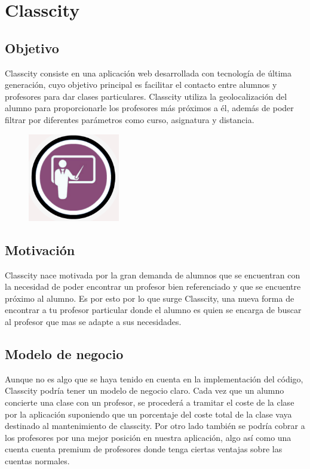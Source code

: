 \section{Classcity}
\subsection{Objetivo}

Classcity consiste en una aplicación web desarrollada con tecnología de última  generación, cuyo objetivo principal es facilitar el contacto entre alumnos y profesores para dar clases particulares. Classcity utiliza la geolocalización del alumno para proporcionarle los profesores más próximos a él, además de poder filtrar por diferentes parámetros como curso, asignatura y distancia.

\begin{figure}[H]
    \centering
    \includegraphics[width=40mm]{memoria/LaTeX/img/introduccion/logo.jpg}
\end{figure}

\subsection{Motivación}

Classcity nace motivada por la gran demanda de alumnos que se encuentran con la necesidad de poder encontrar un profesor bien referenciado y que se encuentre próximo al alumno. Es por esto por lo que surge Classcity, una nueva forma de encontrar a tu profesor particular donde el alumno es quien se encarga de buscar al profesor que mas se adapte a sus necesidades.

\subsection{Modelo de negocio}

Aunque no es algo que se haya tenido en cuenta en la implementación del código, Classcity podría tener un modelo de negocio claro.
Cada vez que un alumno concierte una clase con un profesor, se procederá a tramitar el coste de la clase por la aplicación suponiendo que un porcentaje del coste total de la clase vaya destinado al mantenimiento de classcity.
Por otro lado también se podría cobrar a los profesores por una mejor posición en nuestra aplicación, algo así como una cuenta cuenta premium de profesores donde tenga ciertas ventajas sobre las cuentas normales.

